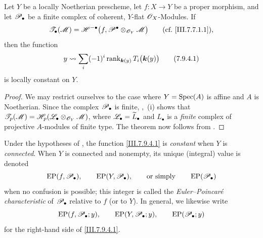 \begin{theorem}[7.9.4]
\label{III.7.9.4}
Let $Y$ be a locally Noetherian prescheme, let
$f:X\to Y$ be a proper morphism, and let
$\mathscr{P}_\bullet$ be a finite complex of coherent,
$Y$-flat $\mathscr{O}_X$-Modules.  If
\[
  \mathscr{T}_\bullet(\mathscr{M})
  =
  \mathscr{H}^{-\bullet}
    \bigl(f,\mathscr{P}^\bullet
      \otimes_{\mathscr{O}_Y}\mathscr{M}\bigr)
  \qquad\text{\rm(cf.~\eqref{III.7.7.1.1})},
\]
then the function
\[
  y\leadsto
  \sum_i(- 1)^i
    \operatorname{rank}_{\boldsymbol{k}(y)}
      T_i\bigl(\boldsymbol{k}(y)\bigr)
  \tag{7.9.4.1}\label{III.7.9.4.1}
\]
is locally constant on $Y$.
\end{theorem}

\begin{proof}
We may restrict ourselves to the case where
$Y=\operatorname{Spec}(A)$ is affine and $A$ is Noetherian.  Since the
complex $\mathscr{P}_\bullet$ is finite, ,~(i)
shows that $\mathscr{T}_p(\mathscr{M})
=
\mathscr{H}_p(\mathscr{L}_\bullet\otimes_{\mathscr{O}_Y}\mathscr{M})$,
where $\mathscr{L}_\bullet=\widetilde{L}_\bullet$ and
$L_\bullet$ is a \emph{finite} complex of projective $A$-modules
of finite type.  The theorem now follows from
.
\end{proof}

\begin{env}[7.9.5]
\label{III.7.9.5}
Under the hypotheses of , the function
\eqref{III.7.9.4.1} is \emph{constant} when $Y$ is
\emph{connected}.  When $Y$ is connected and nonempty, its
unique (integral) value is denoted
\[
  \operatorname{EP}(f,\mathscr{P}_\bullet),\qquad
  \operatorname{EP}(Y,\mathscr{P}_\bullet),
  \qquad\text{or simply}\qquad
  \operatorname{EP}(\mathscr{P}_\bullet)
\]
when no confusion is possible; this integer is called the
\emph{Euler--Poincar\'e characteristic} of
$\mathscr{P}_\bullet$ relative to $f$ (or to $Y$).  In general,
we likewise write
\[
  \operatorname{EP}(f,\mathscr{P}_\bullet;y),\qquad
  \operatorname{EP}(Y,\mathscr{P}_\bullet;y),\qquad
  \operatorname{EP}(\mathscr{P}_\bullet;y)
\]
for the right-hand side of \eqref{III.7.9.4.1}.
\end{env}

